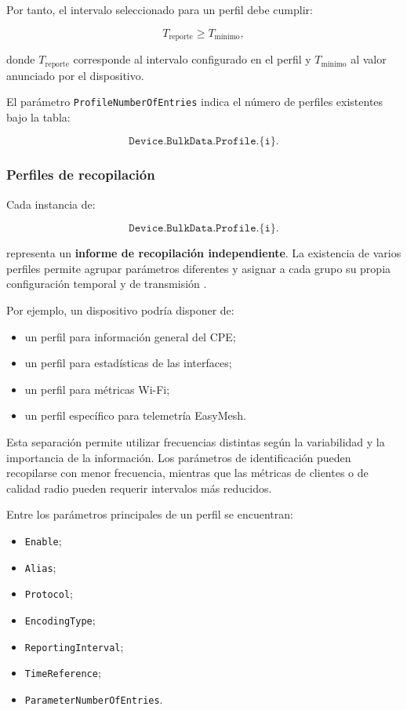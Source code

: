 Por tanto, el intervalo seleccionado para un perfil debe cumplir:

\[
    T_{\mathrm{reporte}}
    \geq
    T_{\mathrm{mínimo}},
\]

donde \(T_{\mathrm{reporte}}\) corresponde al intervalo configurado en el
perfil y \(T_{\mathrm{mínimo}}\) al valor anunciado por el dispositivo.

El parámetro \texttt{ProfileNumberOfEntries} indica el número de perfiles
existentes bajo la tabla:

\[
    \texttt{Device.BulkData.Profile.\{i\}.}
\]


\subsubsection*{Perfiles de recopilación}

Cada instancia de:

\[
    \texttt{Device.BulkData.Profile.\{i\}.}
\]

representa un \textbf{informe de recopilación independiente}. La
existencia de varios perfiles permite agrupar parámetros diferentes y
asignar a cada grupo su propia configuración temporal y de transmisión
\cite{bbf_tr181}.

Por ejemplo, un dispositivo podría disponer de:

\begin{itemize}
    \item un perfil para información general del CPE;
    \item un perfil para estadísticas de las interfaces;
    \item un perfil para métricas Wi-Fi;
    \item un perfil específico para telemetría EasyMesh.
\end{itemize}

Esta separación permite utilizar frecuencias distintas según la
variabilidad y la importancia de la información. Los parámetros de
identificación pueden recopilarse con menor frecuencia, mientras que las
métricas de clientes o de calidad radio pueden requerir intervalos más
reducidos.

Entre los parámetros principales de un perfil se encuentran:

\begin{itemize}
    \item \texttt{Enable};
    \item \texttt{Alias};
    \item \texttt{Protocol};
    \item \texttt{EncodingType};
    \item \texttt{ReportingInterval};
    \item \texttt{TimeReference};
    \item \texttt{ParameterNumberOfEntries}.
\end{itemize}

